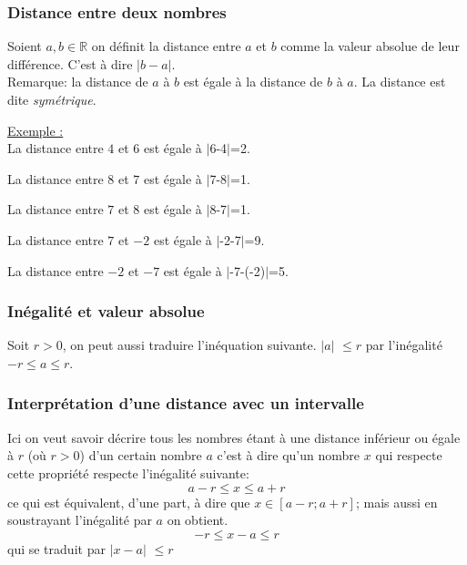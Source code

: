 \documentclass[french]{book}
\newcommand{\R}{\mathbb {R}}
\newcommand{\abs}[1]{$\vert #1 \vert$}
\begin{document}
\subsubsection*{Distance entre deux nombres}


\begin{defn}
Soient $a,b \in \R$ on définit la distance entre $a$ et $b$ comme la valeur absolue de leur différence.
C'est à dire \abs{b-a}. \\

Remarque: la distance de $a$ à $b$ est égale à la distance de $b$ à $a$. La distance est dite \emph{symétrique}.
\end{defn}

\underline{Exemple :}\\

La distance entre $4$ et $6$ est égale à \abs{$6-4$}=2.

La distance entre $8$ et $7$ est égale à \abs{$7-8$}=1.

La distance entre $7$ et $8$ est égale à \abs{$8-7$}=1.

La distance entre $7$ et $-2$ est égale à \abs{$-2-7$}=9.

La distance entre $-2$ et $-7$ est égale à \abs{$-7-(-2)$}=5.


\subsubsection*{Inégalité et valeur absolue}
Soit $r>0$, on peut aussi traduire l'inéquation suivante.
\abs{a} $\leq r$ par l'inégalité $-r \leq a \leq r$.

\subsubsection*{Interprétation d'une distance avec un intervalle}

Ici on veut savoir décrire tous les nombres étant à une distance inférieur ou égale à $r$ (où $r > 0$) d'un certain nombre $a$
c'est à dire qu'un nombre $x$ qui respecte cette propriété respecte l'inégalité suivante:
$$a-r\leq x \leq a+r$$
ce qui est équivalent, d'une part, à dire que $x \in [a-r;a+r]$; mais aussi en soustrayant l'inégalité par $a$ on obtient.
$$-r\leq x-a \leq r$$
qui se traduit par \abs{x-a} $\leq r$
\end{document}

